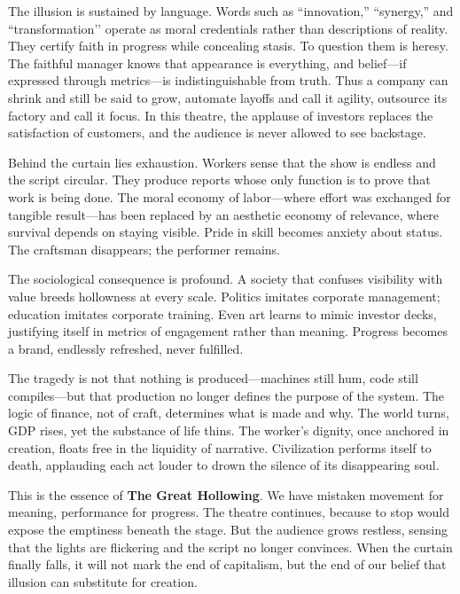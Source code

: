 \documentclass[11pt,twoside]{book}
\begin{document}
The illusion is sustained by language.  Words such as “innovation,” “synergy,” and “transformation’’ operate as moral credentials rather than descriptions of reality.  They certify faith in progress while concealing stasis.  To question them is heresy.  The faithful manager knows that appearance is everything, and belief—if expressed through metrics—is indistinguishable from truth.  Thus a company can shrink and still be said to grow, automate layoffs and call it agility, outsource its factory and call it focus.  In this theatre, the applause of investors replaces the satisfaction of customers, and the audience is never allowed to see backstage.

Behind the curtain lies exhaustion.  Workers sense that the show is endless and the script circular.  They produce reports whose only function is to prove that work is being done.  The moral economy of labor—where effort was exchanged for tangible result—has been replaced by an aesthetic economy of relevance, where survival depends on staying visible.  Pride in skill becomes anxiety about status.  The craftsman disappears; the performer remains.

The sociological consequence is profound.  A society that confuses visibility with value breeds hollowness at every scale.  Politics imitates corporate management; education imitates corporate training.  Even art learns to mimic investor decks, justifying itself in metrics of engagement rather than meaning.  Progress becomes a brand, endlessly refreshed, never fulfilled.  

The tragedy is not that nothing is produced—machines still hum, code still compiles—but that production no longer defines the purpose of the system.  The logic of finance, not of craft, determines what is made and why.  The world turns, GDP rises, yet the substance of life thins.  The worker’s dignity, once anchored in creation, floats free in the liquidity of narrative.  Civilization performs itself to death, applauding each act louder to drown the silence of its disappearing soul.

This is the essence of \textbf{The Great Hollowing}.  We have mistaken movement for meaning, performance for progress.  The theatre continues, because to stop would expose the emptiness beneath the stage.  But the audience grows restless, sensing that the lights are flickering and the script no longer convinces.  When the curtain finally falls, it will not mark the end of capitalism, but the end of our belief that illusion can substitute for creation.
\end{document}

